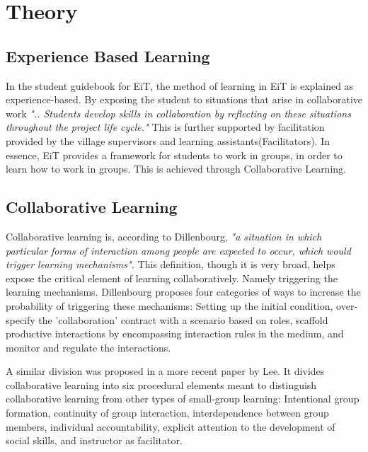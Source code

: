 \chapter{Theory}
 
    \section{Experience Based Learning}
        In the student guidebook for EiT\cite{EiTGuide}, the method of learning in EiT is explained as experience-based. By exposing the student to situations that arise in collaborative work \emph{"..  Students develop skills in collaboration by reflecting on these situations throughout the project life cycle."}\cite{EiTGuide} This is further supported by facilitation provided by the village supervisors and learning assistants(Facilitators).\cite{EiTGuide} In essence, EiT provides a framework for students to work in groups, in order to learn how to work in groups. This is achieved through Collaborative Learning.
        
        
        
    \section{Collaborative Learning}
        Collaborative learning is, according to Dillenbourg, \emph{"a situation in which particular forms of interaction among people are expected to occur, which would trigger learning mechanisms".} \cite{dillenbourg1999} This definition, though it is very broad, helps expose the critical element of learning collaboratively. Namely triggering the learning mechanisms. Dillenbourg proposes four categories of ways to increase the probability of triggering these mechanisms: Setting up the initial condition, over-specify the 'collaboration' contract with a scenario based on roles, scaffold productive interactions by encompassing interaction rules in the medium, and monitor and regulate the interactions. \cite{dillenbourg1999}
        
        A similar division was proposed in a more recent paper by Lee. It divides collaborative learning into six procedural elements meant to distinguish collaborative learning from other types of small-group learning: Intentional group formation, continuity of group interaction, interdependence between group members, individual accountability, explicit attention to the development of social skills, and instructor as facilitator. \cite{Lee2009}
        
